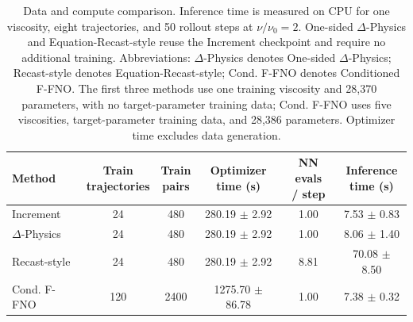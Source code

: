 \begin{table}[!t]
\centering
\normalsize
\setlength{\tabcolsep}{3pt}
\renewcommand{\arraystretch}{1.17}
\begin{tabular}{@{}lccccc@{}}
\toprule
Method & \shortstack{Train\\trajectories} & \shortstack{Train\\pairs} & \shortstack{Optimizer\\time (s)} & \shortstack{NN evals\\/ step} & \shortstack{Inference\\time (s)} \\
\midrule
Increment & 24 & 480 & 280.19 $\pm$ 2.92 & 1.00 & 7.53 $\pm$ 0.83 \\
$\Delta$-Physics & 24 & 480 & 280.19 $\pm$ 2.92 & 1.00 & 8.06 $\pm$ 1.40 \\
Recast-style & 24 & 480 & 280.19 $\pm$ 2.92 & 8.81 & 70.08 $\pm$ 8.50 \\
Cond. F-FNO & 120 & 2400 & 1275.70 $\pm$ 86.78 & 1.00 & 7.38 $\pm$ 0.32 \\
\bottomrule
\end{tabular}
\caption{Data and compute comparison. Inference time is measured on CPU for one viscosity, eight trajectories, and 50 rollout steps at $\nu/\nu_0=2$. One-sided $\Delta$-Physics and Equation-Recast-style reuse the Increment checkpoint and require no additional training. Abbreviations: $\Delta$-Physics denotes One-sided $\Delta$-Physics; Recast-style denotes Equation-Recast-style; Cond. F-FNO denotes Conditioned F-FNO. The first three methods use one training viscosity and 28,370 parameters, with no target-parameter training data; Cond. F-FNO uses five viscosities, target-parameter training data, and 28,386 parameters. Optimizer time excludes data generation.}
\label{tab:data_compute}
\end{table}
